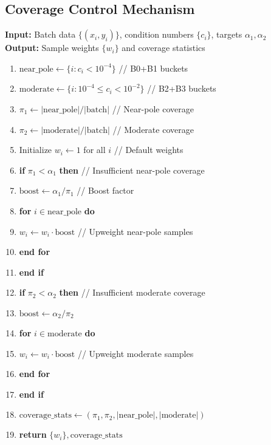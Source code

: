 \documentclass[twoside,11pt]{article}
\begin{document}
\subsection{Coverage Control Mechanism}

\begin{tcolorbox}[colback=gray!5!white,colframe=gray!75!black,title=\textbf{Algorithm \refstepcounter{algctr}\thealgctr: Coverage Control for Near-Pole Sampling}]
\label{alg:coverage-control}
\textbf{Input:} Batch data $\{(x_i, y_i)\}$, condition numbers $\{c_i\}$, targets $\alpha_1, \alpha_2$ \\
\textbf{Output:} Sample weights $\{w_i\}$ and coverage statistics

\begin{enumerate}
\item $\text{near\_pole} \leftarrow \{i : c_i < 10^{-4}\}$ \hfill // B0+B1 buckets
\item $\text{moderate} \leftarrow \{i : 10^{-4} \leq c_i < 10^{-2}\}$ \hfill // B2+B3 buckets
\item $\pi_1 \leftarrow |\text{near\_pole}| / |\text{batch}|$ \hfill // Near-pole coverage
\item $\pi_2 \leftarrow |\text{moderate}| / |\text{batch}|$ \hfill // Moderate coverage
\item Initialize $w_i \leftarrow 1$ for all $i$ \hfill // Default weights
\item \textbf{if} $\pi_1 < \alpha_1$ \textbf{then} \hfill // Insufficient near-pole coverage
\item \quad $\text{boost} \leftarrow \alpha_1 / \pi_1$ \hfill // Boost factor
\item \quad \textbf{for} $i \in \text{near\_pole}$ \textbf{do}
\item \quad \quad $w_i \leftarrow w_i \cdot \text{boost}$ \hfill // Upweight near-pole samples
\item \quad \textbf{end for}
\item \textbf{end if}
\item \textbf{if} $\pi_2 < \alpha_2$ \textbf{then} \hfill // Insufficient moderate coverage
\item \quad $\text{boost} \leftarrow \alpha_2 / \pi_2$
\item \quad \textbf{for} $i \in \text{moderate}$ \textbf{do}
\item \quad \quad $w_i \leftarrow w_i \cdot \text{boost}$ \hfill // Upweight moderate samples
\item \quad \textbf{end for}
\item \textbf{end if}
\item $\text{coverage\_stats} \leftarrow (\pi_1, \pi_2, |\text{near\_pole}|, |\text{moderate}|)$
\item \textbf{return} $\{w_i\}, \text{coverage\_stats}$
\end{enumerate}
\end{tcolorbox}
\end{document}
